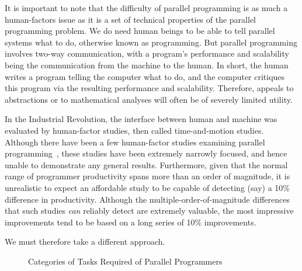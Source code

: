 
It is important to note that the difficulty of parallel programming
is as much a human-factors issue as it is a set of technical properties of the
parallel programming problem.
We do need human beings to be able to tell parallel
systems what to do, otherwise known as programming.
But parallel programming involves two-way communication, with
a program's performance and scalability being the communication from
the machine to the human.
In short, the human writes a program telling the computer what to do,
and the computer critiques this program via the resulting performance and
scalability.
Therefore, appeals to abstractions or to mathematical analyses will
often be of severely limited utility.

In the Industrial Revolution, the interface between human and machine
was evaluated by human-factor studies, then called time-and-motion
studies.
Although there have been a few human-factor studies examining parallel
programming~\cite{RyanEccles2005HPCSNovice,RyanEccles2006HPCSNoviceNeeds,
LorinHochstein2005SC,DuaneSzafron1994PEMPDS}, these studies have
been extremely narrowly focused, and hence unable to demonstrate any
general results.
Furthermore, given that the normal range of programmer productivity
spans more than an order of magnitude, it is unrealistic to expect
an affordable study to be capable of detecting (say) a 10\% difference
in productivity.
Although the multiple-order-of-magnitude differences that such studies
\emph{can} reliably detect are extremely valuable, the most impressive
improvements tend to be based on a long series of 10\% improvements.

We must therefore take a different approach.

\begin{figure}[tb]
\centering
{}
\caption{Categories of Tasks Required of Parallel Programmers}
\label{fig:intro:Categories of Tasks Required of Parallel Programmers}
\end{figure}

